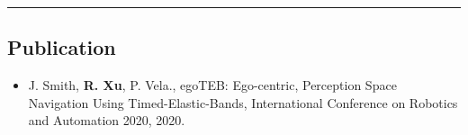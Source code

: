 \cvcond{\vspace{-0.5em}}

\hrule
\vspace{-1em}
\subsection*{Publication}
\cvcond{\vspace{-0.5em}}

\begin{itemize}[label={}, leftmargin=1em]
	\item J. Smith, \textbf{R. Xu}, P. Vela., egoTEB: Ego-centric, Perception Space Navigation Using Timed-Elastic-Bands, International Conference on Robotics and Automation 2020, 2020.
\end{itemize}
